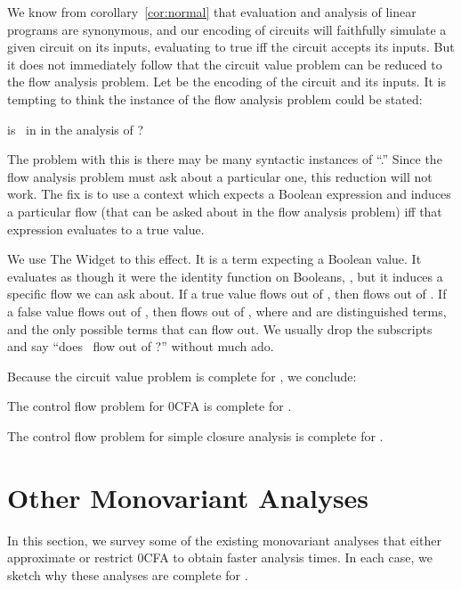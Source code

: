 We know from corollary~\ref{cor:normal} that evaluation and analysis
of linear programs are synonymous, and our encoding of circuits will
faithfully simulate a given circuit on its inputs, evaluating to true
iff the circuit accepts its inputs.  But it does not immediately
follow that the circuit value problem can be reduced to the flow
analysis problem.  Let  be the encoding of the circuit
and its inputs.  It is tempting to think the instance of the flow
analysis problem could be stated:
\begin{center}
is \True\ in  in the analysis
of ?
\end{center}
The problem with this is there may be many syntactic instances of
``\True.''  Since the flow analysis problem must ask about a particular
one, this reduction will not work.  The fix is to use a context which
expects a Boolean expression and induces a particular flow (that can
be asked about in the flow analysis problem) iff that expression
evaluates to a true value.

We use The Widget to this effect.  It is a term expecting a Boolean
value.  It evaluates as though it were the identity function on
Booleans, , but it induces a specific flow we can ask
about. If a true value flows out of , then  flows out of
.  If a false value flows out of , then 
flows out of , where  and  are
distinguished terms, and the only possible terms that can flow out.
We usually drop the subscripts and say ``does \True\ flow out of
?''  without much ado.




Because the circuit value problem is complete for \ptime, we
conclude:

\begin{theorem}
The control flow problem for 0CFA is complete for \ptime.
\end{theorem}

\begin{corollary}
The control flow problem for simple closure analysis is complete for \ptime.
\end{corollary}

\section{Other Monovariant Analyses}

In this section, we survey some of the existing monovariant analyses
that either approximate or restrict 0CFA to obtain faster analysis
times.  In each case, we sketch why these analyses are complete for
\ptime.

